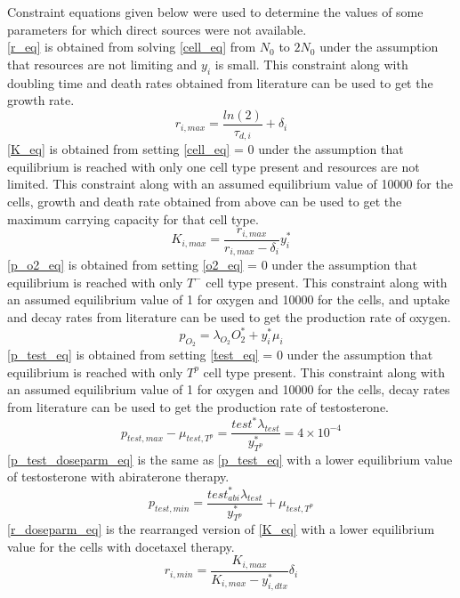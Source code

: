 Constraint equations given below were used to determine the values of some parameters for which direct sources were not available.\\
\autoref{r_eq} is obtained from solving \autoref{cell_eq} from $N_0$ to $2N_0$ under the assumption that resources are not limiting and $y_i$ is small. This constraint along with doubling time and death rates obtained from literature can be used to get the growth rate.
\begin{equation}
  r_{i,max} = \frac{ln(2)}{\tau_{d,i}} + \delta_i
  \label{r_eq}
\end{equation}
\autoref{K_eq} is obtained from setting \autoref{cell_eq} = 0 under the assumption that equilibrium is reached with only one cell type present and resources are not limited. This constraint along with an assumed equilibrium value of 10000 for the cells, growth and death rate obtained from above can be used to get the maximum carrying capacity for that cell type.
\begin{equation}
  K_{i,max}=\frac{r_{i,max}}{r_{i,max}-\delta_i} y_i^*
  \label{K_eq}
\end{equation}
\autoref{p_o2_eq} is obtained from setting \autoref{o2_eq} = 0 under the assumption that equilibrium is reached with only $T^-$ cell type present. This constraint along with an assumed equilibrium value of 1 for oxygen and 10000 for the cells, and uptake and decay rates from literature can be used to get the production rate of oxygen.
\begin{equation}
  p_{O_2} = \lambda_{O_2} O_2^* + y_i^* \mu_i
  \label{p_o2_eq}
\end{equation}
\autoref{p_test_eq} is obtained from setting \autoref{test_eq} = 0 under the assumption that equilibrium is reached with only $T^p$ cell type present. This constraint along with an assumed equilibrium value of 1 for oxygen and 10000 for the cells, decay rates from literature can be used to get the production rate of testosterone.
\begin{equation}
  p_{test,max} - \mu_{test,T^p} = \frac{test^* \lambda_{test}}{y_{T^p}^*} = 4 \times 10^{-4}
  \label{p_test_eq}
\end{equation}
\autoref{p_test_doseparm_eq} is the same as \autoref{p_test_eq} with a lower equilibrium value of testosterone with abiraterone therapy.
\begin{equation}
  p_{test,min} = \frac{test_{abi}^* \lambda_{test}}{y_{T^p}^*} + \mu_{test,T^p}
  \label{p_test_doseparm_eq}
\end{equation}
\autoref{r_doseparm_eq} is the rearranged version of \autoref{K_eq} with a lower equilibrium value for the cells with docetaxel therapy.
\begin{equation}
  r_{i,min}=\frac{K_{i,max}}{K_{i,max} - y_{i,dtx}^*} \delta_i
  \label{r_doseparm_eq}
\end{equation}

